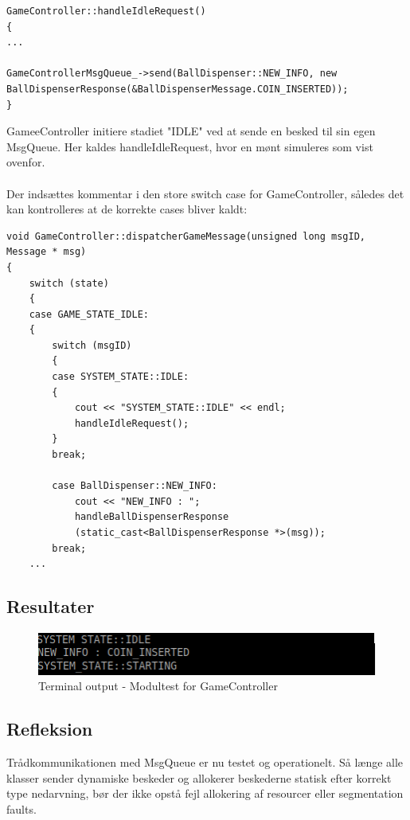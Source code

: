 \documentclass[Modultest/Modultest_main.tex]{subfiles}
\begin{document}
\begin{lstlisting}
GameController::handleIdleRequest()
{
...

GameControllerMsgQueue_->send(BallDispenser::NEW_INFO, new
BallDispenserResponse(&BallDispenserMessage.COIN_INSERTED));
}
\end{lstlisting}
GameeController initiere stadiet "IDLE" ved at sende en besked til sin egen MsgQueue. Her kaldes handleIdleRequest, hvor en mønt simuleres som vist ovenfor. \\\\
Der indsættes kommentar i den store switch case for GameController, således det kan kontrolleres at de korrekte cases bliver kaldt: 
\begin{lstlisting}
void GameController::dispatcherGameMessage(unsigned long msgID, Message * msg)
{
	switch (state)
	{
	case GAME_STATE_IDLE:
	{
		switch (msgID)
		{
		case SYSTEM_STATE::IDLE:
		{
			cout << "SYSTEM_STATE::IDLE" << endl;
			handleIdleRequest();
		}
		break;

		case BallDispenser::NEW_INFO:
			cout << "NEW_INFO : ";
			handleBallDispenserResponse
			(static_cast<BallDispenserResponse *>(msg));
		break;
    ...
\end{lstlisting}

\subsection{Resultater}
\begin{figure}[H]
    \centering
    \includegraphics[width=\textwidth]{Modultest/GameController/graphic/Modeltest.png}
    \caption{Terminal output - Modultest for GameController}
    \label{fig:test_game}
\end{figure}

\subsection{Refleksion}
Trådkommunikationen med MsgQueue er nu testet og operationelt. Så længe alle klasser sender dynamiske beskeder og allokerer beskederne statisk efter korrekt type nedarvning, bør der ikke opstå fejl allokering af resourcer eller segmentation faults.
\end{document}
